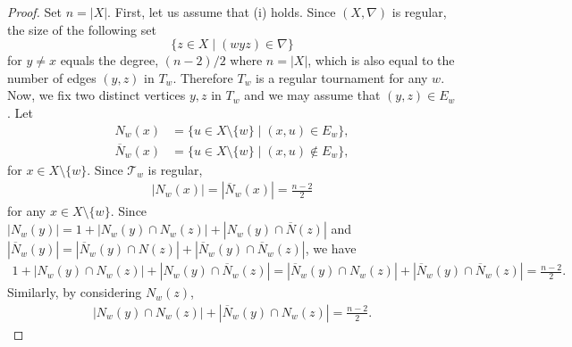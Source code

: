 \documentclass[10pt,a4paper]{amsart}
\begin{document}
\begin{proof}
    Set $n=|X|$. 
   First, let us assume that (i)  holds.     Since $(X,\nabla)$ is regular, 
    the size of the following set 
    \[
    \{z\in X \mid (wyz)\in\nabla\}
    \]
    for $y\neq x$ equals the degree, $(n-2)/2$ where $n=|X|$, which is also equal to the number of edges $(y,z)$ in $T_w$. 
    Therefore $T_w$ is a regular tournament for any $w$. 
    Now, we fix two distinct vertices $y,z$ in $T_w$ and we may assume that $(y,z)\in E_w$. Let
    \begin{align*}
        N_w(x)&=\{u\in X\setminus\{w\} \mid (x,u)\in E_w\},\\
        \overline{N}_w(x)&=\{u\in X\setminus\{w\} \mid (x,u)\not\in E_w\}, 
    \end{align*}
    for $x\in X\setminus\{w\}$. 
    Since $\mathcal{T}_w$ is regular, 
    \begin{align*}
        |N_w(x)|=|\overline{N}_w(x)|=\frac{n-2}{2}    
    \end{align*}
    for any $x\in X\setminus\{w\}$. 
    Since $|N_w(y)|=1+|N_w(y)\cap N_w(z)|+|N_w(y)\cap \overline{N}(z)|$ and $|\overline{N}_w(y)|=|\overline{N}_w(y)\cap N(z)|+|\overline{N}_w(y)\cap \overline{N}_w(z)|$,  we have 
    \begin{align}\label{eq:drt1}
        1+|N_w(y)\cap N_w(z)|+|N_w(y)\cap \overline{N}_w(z)|=|\overline{N}_w(y)\cap N_w(z)|+|\overline{N}_w(y)\cap \overline{N}_w(z)|=\frac{n-2}{2}.  
    \end{align}
    Similarly, by considering $N_w(z)$, 
    \begin{align}\label{eq:drt11}
        |N_w(y)\cap N_w(z)|+|\overline{N}_w(y)\cap N_w(z)|=\frac{n-2}{2}.  
    \end{align}
    


\end{proof}
\end{document}
